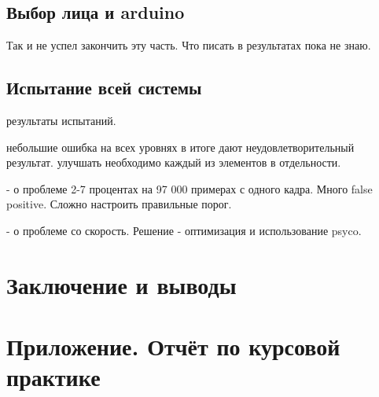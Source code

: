 \documentclass[12pt]{report}
\begin{document}
\section{Выбор лица и arduino}
Так и не успел закончить эту часть. Что писать в результатах пока не знаю.
\section{Испытание всей системы}
результаты испытаний.

небольшие ошибка на всех уровнях в итоге дают неудовлетворительный результат. улучшать необходимо каждый из элементов в отдельности.

- о проблеме 2-7 процентах на 97 000 примерах с одного кадра. Много false positive. Сложно настроить правильные порог.

- о проблеме со скорость. Решение - оптимизация и использование psyco.

\chapter*{Заключение и выводы}
\thispagestyle{fancy}


\appendix
\chapter{Приложение. Отчёт по курсовой практике}









\end{document}
